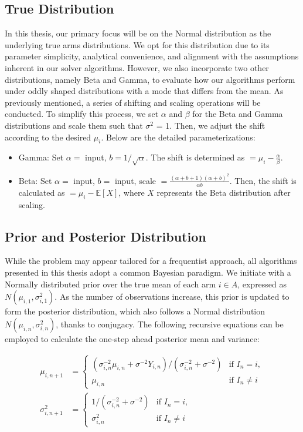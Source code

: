 \documentclass[a4paper, 12pt]{article}
\theoremstyle{definition}
\begin{document}
\subsection{True Distribution}
In this thesis, our primary focus will be on the Normal distribution as the underlying true arms distributions. We opt for this distribution due to its parameter simplicity, analytical convenience, and alignment with the assumptions inherent in our solver algorithms. However, we also incorporate two other distributions, namely Beta and Gamma, to evaluate how our algorithms perform under oddly shaped distributions with a mode that differs from the mean. As previously mentioned, a series of shifting and scaling operations will be conducted. To simplify this process, we set $\alpha$ and $\beta$ for the Beta and Gamma distributions and scale them such that $\sigma^2$ = 1. Then, we adjust the shift according to the desired $\mu_i$. Below are the detailed parameterizations:

\begin{itemize}
    \item Gamma: Set $\alpha =$ input, $b = 1/\sqrt{\alpha}$. The shift is determined as $= \mu_i - \frac{\alpha}{\beta}$.
    \item Beta: Set $\alpha =$ input, $b =$ input, scale $= \frac{(\alpha+b+1)(\alpha+b)^2}{\alpha b}$. Then, the shift is calculated as $= \mu_i-\mathbb{E}[X]$, where $X$ represents the Beta distribution after scaling.
\end{itemize}


\subsection{Prior and Posterior Distribution}

While the problem may appear tailored for a frequentist approach, all algorithms presented in this thesis adopt a common Bayesian paradigm. We initiate with a Normally distributed prior over the true mean of each arm $i\in A$, expressed as $N(\mu_{i,1},\sigma_{i,1}^2)$. As the number of observations increase, this prior is updated to form the posterior distribution, which also follows a Normal distribution $N(\mu_{i,n},\sigma_{i,n}^2)$, thanks to conjugacy. The following recursive equations can be employed to calculate the one-step ahead posterior mean and variance:

\begin{align} 
\mu_{i,n+1} &=
\begin{cases} \label{eq:miu_update}
    (\sigma_{i,n}^{-2} \mu_{i,n} + \sigma^{-2} Y_{i,n}) / (\sigma_{i,n}^{-2} + \sigma^{-2}) & \text{if } I_n = i, \\
    \mu_{i,n} & \text{if } I_n \neq i
\end{cases} \\
\sigma_{i,n+1}^2 &=
\begin{cases} \label{eq:sigma_update}
    1 / (\sigma_{i,n}^{-2} + \sigma^{-2}) & \text{if } I_n = i, \\
    \sigma_{i,n}^2 & \text{if } I_n \neq i
\end{cases}
\end{align}
\end{document}
